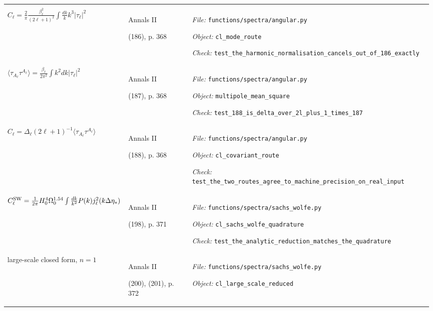 \begin{landscape}
\begin{longtable}{@{}>{\raggedright\arraybackslash}p{80mm}
                     >{\raggedright\arraybackslash}p{38mm}
                     >{\raggedright\arraybackslash}p{99mm}@{}}
{\textit{Object:} \nolinkurl{source_integrated}\par
\textit{Check:} \nolinkurl{test_b6_sign_alternative_is_not_a_no_op}} \\
\addlinespace[2pt]
$C_\ell = \frac{2}{\pi}\frac{\beta_\ell^2}{(2\ell+1)^2}\int \frac{dk}{k}k^3|\tau_\ell|^2$ & Annals II\par (186), p. 368 & {\scriptsize \textit{File:} \nolinkurl{functions/spectra/angular.py}\par
\textit{Object:} \nolinkurl{cl_mode_route}\par
\textit{Check:} \nolinkurl{test_the_harmonic_normalisation_cancels_out_of_186_exactly}} \\
\addlinespace[2pt]
$\langle\tau_{A_\ell}\tau^{A_\ell}\rangle = \frac{\beta_\ell}{2\pi^2}\int k^2dk|\tau_\ell|^2$ & Annals II\par (187), p. 368 & {\scriptsize \textit{File:} \nolinkurl{functions/spectra/angular.py}\par
\textit{Object:} \nolinkurl{multipole_mean_square}\par
\textit{Check:} \nolinkurl{test_188_is_delta_over_2l_plus_1_times_187}} \\
\addlinespace[2pt]
$C_\ell = \Delta_\ell(2\ell+1)^{-1}\langle\tau_{A_\ell}\tau^{A_\ell}\rangle$ & Annals II\par (188), p. 368 & {\scriptsize \textit{File:} \nolinkurl{functions/spectra/angular.py}\par
\textit{Object:} \nolinkurl{cl_covariant_route}\par
\textit{Check:} \nolinkurl{test_the_two_routes_agree_to_machine_precision_on_real_input}} \\
\addlinespace[2pt]
$C^{\rm SW}_\ell = \frac{1}{2\pi}H_0^4\Omega_0^{1.54}\int\frac{dk}{k^2}P(k)j_\ell^2(k\Delta\eta_*)$ & Annals II\par (198), p. 371 & {\scriptsize \textit{File:} \nolinkurl{functions/spectra/sachs_wolfe.py}\par
\textit{Object:} \nolinkurl{cl_sachs_wolfe_quadrature}\par
\textit{Check:} \nolinkurl{test_the_analytic_reduction_matches_the_quadrature}} \\
\addlinespace[2pt]
large-scale closed form, $n=1$ & Annals II\par (200), (201), p. 372 & {\scriptsize \textit{File:} \nolinkurl{functions/spectra/sachs_wolfe.py}\par
\textit{Object:} \nolinkurl{cl_large_scale_reduced}\par
}
\end{longtable}
\end{landscape}
